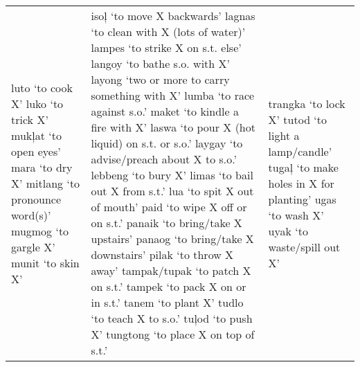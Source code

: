 \begin{table}
{\begin{tabular}{
        >{\RaggedRight\arraybackslash}p{4.55cm}
        >{\RaggedRight\arraybackslash}p{4cm}
        >{\RaggedRight\arraybackslash}p{4.2cm}
       }
luto ‘to cook X’\newline 
luko ‘to trick X’\newline 
mukļat ‘to open eyes’\newline 
mara ‘to dry X’\newline 
mitlang ‘to pronounce word(s)’\newline 
mugmog ‘to gargle X’\newline 
munit ‘to skin X’%
&
isoļ ‘to move X backwards’\newline 
lagnas ‘to clean with X (lots of water)’\newline 
lampes ‘to strike X on s.t. else’\newline 
langoy ‘to bathe s.o. with X’\newline 
layong ‘two or more to carry something with X’\newline 
lumba ‘to race against s.o.’\newline 
maket ‘to kindle a fire with X’\newline 
laswa ‘to pour X (hot liquid) on s.t. or s.o.’\newline 
laygay ‘to advise/preach about X to s.o.’\newline 
lebbeng ‘to bury X’\newline 
limas ‘to bail out X from s.t.’\newline 
lua ‘to spit X out of mouth’\newline 
paid ‘to wipe X off or on s.t.’\newline 
panaik ‘to bring/take X upstairs’\newline 
panaog ‘to bring/take X downstairs’\newline 
pilak ‘to throw X away’\newline 
tampak/tupak ‘to patch X on s.t.’ \newline 
tampek ‘to pack X on or in s.t.’ \newline
tanem ‘to plant X’\newline 
tudlo ‘to teach X to s.o.’\newline 
tuļod ‘to push X’\newline 
tungtong ‘to place X on
top of s.t.’ %
&
trangka ‘to lock X’\newline 
tutod ‘to light a lamp/candle’\newline 
tugaļ ‘to make holes in X for planting’\newline 
ugas ‘to wash X’\newline 
uyak ‘to waste/spill out X’\newline 

\end{tabular}}
\end{table}
